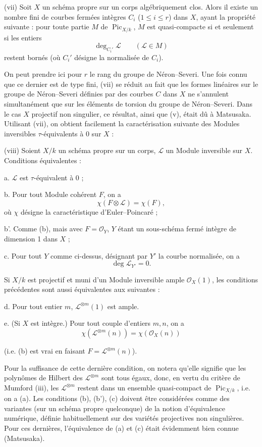 \medskip
\noindent(vii) Soit $X$ un schéma propre sur un corps algébriquement clos.
Alors il existe un nombre fini de courbes fermées intègres $C_i$
($1\leq i\leq r$) dans $X$, ayant la propriété suivante : pour toute partie
$M$ de $\operatorname{Pic}_{X/k}$, $M$ est quasi-compacte si et seulement si
les entiers
\[
\deg_{C_i'}\mathcal L\qquad(\mathcal L\in M)
\]
restent bornés (où $C_i'$ désigne la normalisée de $C_i$).

On peut prendre ici pour $r$ le rang du groupe de Néron--Severi. Une fois connu
que ce dernier est de type fini, (vii) se réduit au fait que les formes
linéaires sur le groupe de Néron--Severi définies par des courbes $C$ dans $X$
ne s'annulent simultanément que sur les éléments de torsion du groupe de
Néron--Severi. Dans le cas $X$ projectif non singulier, ce résultat, ainsi que
(v), était dû à Matsusaka. Utilisant (vii), on obtient facilement la
caractérisation suivante des Modules inversibles $\tau$-équivalents à 0 sur
$X$ :

\medskip
\noindent(viii) Soient $X/k$ un schéma propre sur un corps, $\mathcal L$ un
Module inversible sur $X$. Conditions équivalentes :

\noindent a. $\mathcal L$ est $\tau$-équivalent à 0 ;

\noindent b. Pour tout Module cohérent $F$, on a
\[
\chi(F\otimes\mathcal L)=\chi(F),
\]
où $\chi$ désigne la caractéristique d'Euler--Poincaré ;

\noindent b'. Comme (b), mais avec $F=\mathcal O_Y$, $Y$ étant un
sous-schéma fermé intègre de dimension 1 dans $X$ ;

\noindent c. Pour tout $Y$ comme ci-dessus, désignant par $Y'$ la courbe
normalisée, on a
\[
\deg\mathcal L_{Y'}=0.
\]

Si $X/k$ est projectif et muni d'un Module inversible ample
$\mathcal O_X(1)$, les conditions précédentes sont aussi équivalentes aux
suivantes :

\noindent d. Pour tout entier $m$, $\mathcal L^{\otimes m}(1)$ est ample.

\noindent e. (Si $X$ est intègre.) Pour tout couple d'entiers $m,n$, on a
\[
\chi(\mathcal L^{\otimes m}(n))=\chi(\mathcal O_X(n))
\]

(i.e. (b) est vrai en faisant $F=\mathcal L^{\otimes m}(n)$).

Pour la suffisance de cette dernière condition, on notera qu'elle signifie que
les polynômes de Hilbert des $\mathcal L^{\otimes m}$ sont tous égaux, donc,
en vertu du critère de Mumford (iii), les $\mathcal L^{\otimes m}$ restent
dans un ensemble quasi-compact de $\operatorname{Pic}_{X/k}$, i.e. on a (a).
Les conditions (b), (b'), (c) doivent être considérées comme des variantes
(sur un schéma propre quelconque) de la notion d'équivalence numérique, définie
habituellement sur des variétés projectives non singulières. Pour ces
dernières, l'équivalence de (a) et (c) était évidemment bien connue
(Matsusaka).

